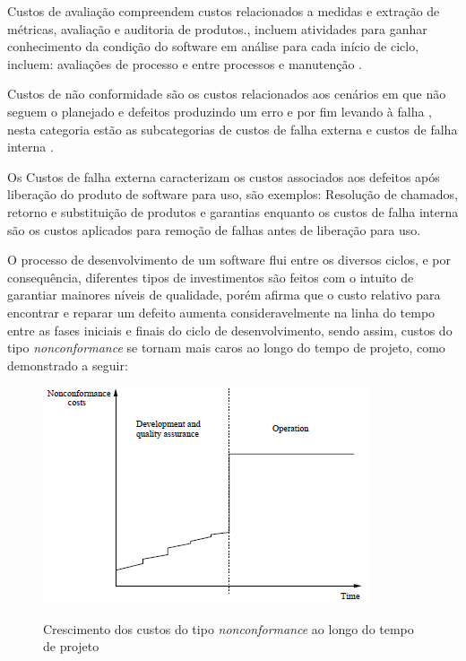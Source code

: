 \documentclass[
	12pt,				%
	oneside,			%
	a4paper,			%
	english,			%
	brazil				%
	]{abntex2ppgsi}
\begin{document}
Custos de avaliação compreendem custos relacionados a medidas e extração de métricas, avaliação e auditoria de produtos.\cite{wagner2005}, incluem atividades para ganhar conhecimento da condição do software em análise para cada início de ciclo, incluem: avaliações de processo e entre processos e manutenção \cite{pressman2009engenharia}.

Custos de não conformidade são os custos relacionados aos cenários em que não seguem o planejado e defeitos produzindo um erro e por fim levando à falha \cite{wagner2005}, nesta categoria estão as subcategorias de custos de falha externa e custos de falha interna \cite{pressman2009engenharia}. 

Os Custos de falha externa caracterizam os custos associados aos defeitos após liberação do produto de software para uso, são exemplos: Resolução de chamados, retorno e substituição de produtos e garantias \cite{pressman2009engenharia} enquanto os custos de falha interna são os custos aplicados para remoção de falhas antes de liberação para uso.

O processo de desenvolvimento de um software flui entre os diversos ciclos, e por consequência, diferentes tipos de investimentos são feitos com o intuito de garantiar mainores níveis de qualidade, porém \cite{pressman2009engenharia} afirma que o custo relativo para encontrar e reparar um defeito aumenta consideravelmente na linha do tempo entre as fases iniciais e finais do ciclo de desenvolvimento, sendo assim, custos do tipo \textit{nonconformance} se tornam mais caros ao longo do tempo de projeto, como demonstrado a seguir:

\begin{figure}[H]%
	\centering
 	  \caption{Crescimento dos custos do tipo \textit{nonconformance} ao longo do tempo de projeto}
		\includegraphics{nonconformance-costs-timeline.png}
	\label{fig:framework-teste}
\end{figure}
\end{document}
